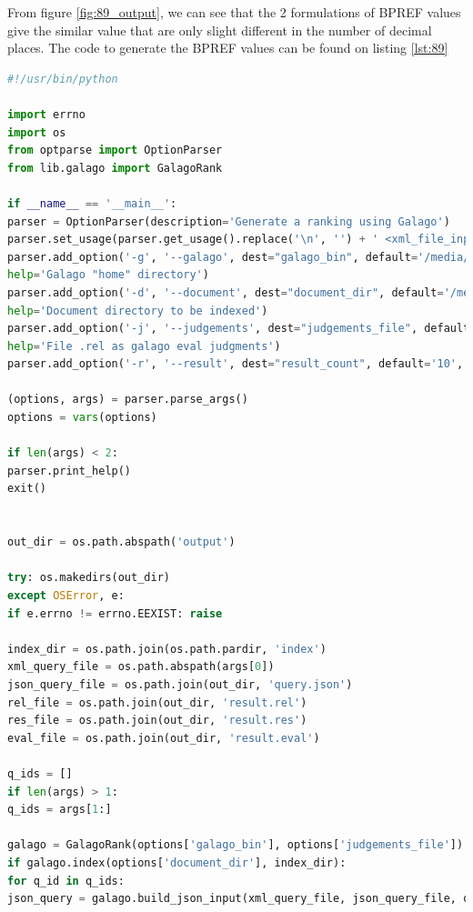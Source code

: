 \documentclass[letterpaper,11pt]{article}
\begin{document}
From figure \ref{fig:89_output}, we can see that the 2 formulations of BPREF values give the similar value that are only slight different in the number of decimal places.  The code to generate the BPREF values can be found on listing \ref{lst:89}

\begin{lstlisting}[language=python, caption={Code for calculating BPREF values}, label={lst:89}]
#!/usr/bin/python

import errno
import os
from optparse import OptionParser
from lib.galago import GalagoRank

if __name__ == '__main__':
parser = OptionParser(description='Generate a ranking using Galago')
parser.set_usage(parser.get_usage().replace('\n', '') + ' <xml_file_input> [q1 ... qn]')
parser.add_option('-g', '--galago', dest="galago_bin", default='/media/erikaris/DATA/ODU/Semester_3/intro_to_info_retrieval/galago/galago-3.10-bin/bin/galago',
help='Galago "home" directory')
parser.add_option('-d', '--document', dest="document_dir", default='/media/erikaris/DATA/ODU/Semester_3/intro_to_info_retrieval/assignments/a4/code-report/cacm',
help='Document directory to be indexed')
parser.add_option('-j', '--judgements', dest="judgements_file", default='/media/erikaris/DATA/ODU/Semester_3/intro_to_info_retrieval/assignments/a4/code-report/cacm.rel',
help='File .rel as galago eval judgments')
parser.add_option('-r', '--result', dest="result_count", default='10', help='Number of result')

(options, args) = parser.parse_args()
options = vars(options)

if len(args) < 2:
parser.print_help()
exit()


out_dir = os.path.abspath('output')

try: os.makedirs(out_dir)
except OSError, e:
if e.errno != errno.EEXIST: raise

index_dir = os.path.join(os.path.pardir, 'index')
xml_query_file = os.path.abspath(args[0])
json_query_file = os.path.join(out_dir, 'query.json')
rel_file = os.path.join(out_dir, 'result.rel')
res_file = os.path.join(out_dir, 'result.res')
eval_file = os.path.join(out_dir, 'result.eval')

q_ids = []
if len(args) > 1:
q_ids = args[1:]

galago = GalagoRank(options['galago_bin'], options['judgements_file'])
if galago.index(options['document_dir'], index_dir):
for q_id in q_ids:
json_query = galago.build_json_input(xml_query_file, json_query_file, q_id)


\end{lstlisting}
\end{document}

